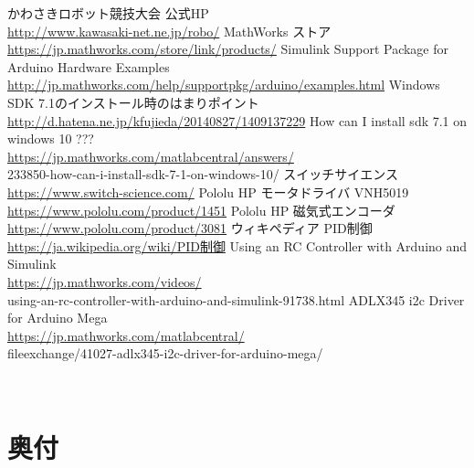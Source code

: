 \documentclass[a4paper,11pt,oneside,openany]{jsbook}
\begin{document}
\begin{thebibliography}{20}
かわさきロボット競技大会 公式HP\\
  \url{http://www.kawasaki-net.ne.jp/robo/}
MathWorks ストア\\
  \url{https://jp.mathworks.com/store/link/products/}
Simulink Support Package for Arduino Hardware Examples\\
  \url{http://jp.mathworks.com/help/supportpkg/arduino/examples.html}
Windows SDK 7.1のインストール時のはまりポイント\\
  \url{http://d.hatena.ne.jp/kfujieda/20140827/1409137229}
How can I install sdk 7.1 on windows 10 ???\\
  \url{https://jp.mathworks.com/matlabcentral/answers/}\\
    233850-how-can-i-install-sdk-7-1-on-windows-10/
スイッチサイエンス\\
  \url{https://www.switch-science.com/}
Pololu HP モータドライバ VNH5019\\
  \url{https://www.pololu.com/product/1451}
Pololu HP 磁気式エンコーダ\\
  \url{https://www.pololu.com/product/3081}
ウィキペディア PID制御\\
  \url{https://ja.wikipedia.org/wiki/PID制御}
Using an RC Controller with Arduino and Simulink\\
  \url{https://jp.mathworks.com/videos/}\\
    using-an-rc-controller-with-arduino-and-simulink-91738.html
ADLX345 i2c Driver for Arduino Mega\\
  \url{https://jp.mathworks.com/matlabcentral/}\\
    fileexchange/41027-adlx345-i2c-driver-for-arduino-mega/
\end{thebibliography}
\thispagestyle{empty} 　

\backmatter %
\chapter{奥付}
\thispagestyle{empty} 
\end{document}
